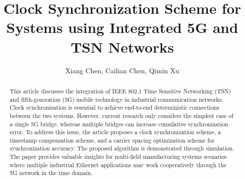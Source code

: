 \documentclass[english]{cccconf}
\begin{document}
\title{Clock Synchronization Scheme for Systems using Integrated 5G and TSN Networks}
	

\author{Xiang Chen,
	Cailian Chen,
	Qimin Xu}




\maketitle
\begin{abstract}
This article discusses the integration of IEEE 802.1 Time Sensitive Networking (TSN) and fifth-generation (5G) mobile technology in industrial communication networks. Clock synchronization is essential to achieve end-to-end deterministic connections between the two systems. However, current research only considers the simplest case of a single 5G bridge, whereas multiple bridges can increase cumulative synchronization error. To address this issue, the article proposes a clock synchronization scheme, a timestamp compensation scheme, and a carrier spacing optimization scheme for synchronization accuracy. The proposed algorithm is demonstrated through simulation. The paper provides valuable insights for multi-field manufacturing systems scenarios where multiple industrial Ethernet applications may work cooperatively through the 5G network in the time domain.
\end{abstract}

\end{document}
